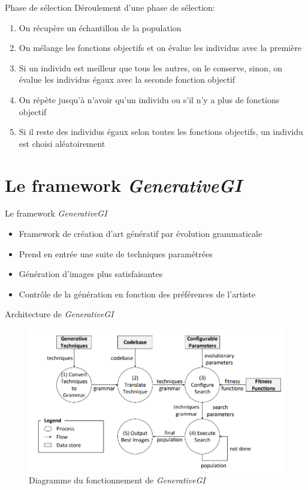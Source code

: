 \documentclass[aspectratio=169]{beamer}
\begin{document}
\begin{frame}{Phase de sélection}
    Déroulement d'une phase de sélection:
    \begin{enumerate}
        \item On récupère un échantillon de la population 
        \item On mélange les fonctions objectifs et on évalue les individus avec la première
        \item Si un individu est meilleur que tous les autres, on le conserve, sinon, on évalue les individus égaux avec la seconde fonction objectif
        \item On répète jusqu'à n'avoir qu'un individu ou s'il n'y a plus de fonctions objectif 
        \item Si il reste des individus égaux selon toutes les fonctions objectifs, un individu est choisi aléatoirement
    \end{enumerate}
\end{frame}

\section{Le framework \textit{GenerativeGI}}

\begin{frame}{Le framework \textit{GenerativeGI}}
    \begin{itemize}
        \item Framework de création d'art génératif par évolution grammaticale 
        \item Prend en entrée une suite de techniques paramétrées 
        \item Génération d'images plus satisfaisantes
        \item Contrôle de la génération en fonction des préférences de l'artiste  
    \end{itemize}
\end{frame}

\begin{frame}{Architecture de \textit{GenerativeGI}}
    \begin{figure}
        \centering
        \includegraphics[scale=0.4]{fig/archi.png}
        \caption{Diagramme du fonctionnement de \textit{GenerativeGI}}
    \end{figure}
\end{frame}
\end{document}
